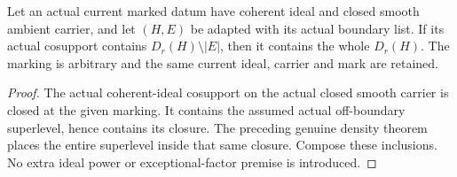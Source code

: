 \begin{theorem}
\label{hir:general-nc-actual-closed-cosupport-off-boundary-propagation}
Let an actual current marked datum have coherent ideal and closed
smooth ambient carrier, and let $(H,E)$ be adapted with its actual
boundary list. If its actual cosupport contains $D_r(H)\setminus|E|$,
then it contains the whole $D_r(H)$. The marking is arbitrary and the
same current ideal, carrier and mark are retained.
\leanok
\end{theorem}
\begin{proof}
The actual coherent-ideal cosupport on the actual closed smooth
carrier is closed at the given marking. It contains the assumed
actual off-boundary superlevel, hence contains its closure. The
preceding genuine density theorem places the entire superlevel
inside that same closure. Compose these inclusions. No extra ideal
power or exceptional-factor premise is introduced.
\end{proof}

